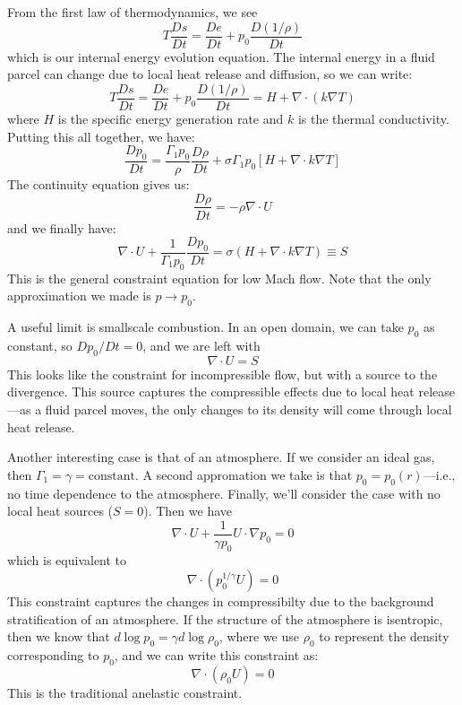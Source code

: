 From the first law of thermodynamics, we see
\begin{equation}
T \frac{Ds}{Dt} = \frac{De}{Dt} + p_0 \frac{D(1/\rho)}{Dt}
\end{equation}
which is our internal energy evolution equation.  The internal
energy in a fluid parcel can change due to local heat release and 
diffusion, so we can write:
\begin{equation}
T \frac{Ds}{Dt} = \frac{De}{Dt} + p_0 \frac{D(1/\rho)}{Dt} = H + \nabla \cdot (k \nabla T)
\end{equation}
where $H$ is the specific energy generation rate and $k$ is the 
thermal conductivity.  Putting this all together, we have:
\begin{equation}
\frac{Dp_0}{Dt} = \frac{\Gamma_1 p_0}{\rho} \frac{D\rho}{Dt}
   + \sigma \Gamma_1 p_0 \left [ H + \nabla \cdot k \nabla T \right ]
\end{equation}
The continuity equation gives us:
\begin{equation}
\frac{D\rho}{Dt} = -\rho \nabla \cdot U
\end{equation}
and we finally have:
\begin{equation}
\nabla \cdot U + \frac{1}{\Gamma_1 p_0}\frac{Dp_0}{Dt} = \sigma (H + \nabla \cdot k  \nabla T) \equiv S
\end{equation}
This is the general constraint equation for low Mach flow.  Note that the
only approximation we made is $p \rightarrow p_0$.

A useful limit is smallscale combustion.  In an open domain, we can take
$p_0$ as constant, so $Dp_0/Dt = 0$, and we are left with
\begin{equation}
\nabla \cdot U = S
\end{equation}
This looks like the constraint for incompressible flow, but with a source
to the divergence.  This source captures the compressible effects due
to local heat release---as a fluid parcel moves, the only changes to
its density will come through local heat release.

Another interesting case is that of an atmosphere.  If we consider an
ideal gas, then $\Gamma_1 = \gamma = \mathrm{constant}$.  A second
appromation we take is that $p_0 = p_0(r)$---i.e., no time
dependence to the atmosphere.  Finally, we'll consider the case
with no local heat sources ($S = 0$).  Then we have
\begin{equation}
\nabla \cdot U + \frac{1}{\gamma p_0} U \cdot \nabla p_0 = 0
\end{equation}
which is equivalent to
\begin{equation}
\nabla \cdot \left ( p_0^{1/\gamma} U \right ) = 0
\end{equation}
This constraint captures the changes in compressibilty due to the 
background stratification of an atmosphere.  If the structure of the
atmosphere is isentropic, then we know that $d\log p_0 = \gamma d\log \rho_0$,
where we use $\rho_0$ to represent the density corresponding to $p_0$, and
we can write this constraint as:
\begin{equation}
\nabla \cdot (\rho_0 U) = 0
\end{equation}
This is the traditional anelastic constraint.


